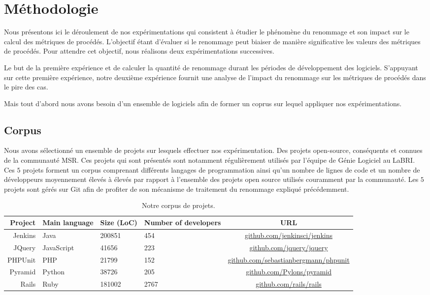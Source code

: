 \section{Méthodologie}
\label{sec:methodologie}

Nous présentons ici le déroulement de nos expérimentations qui consistent à étudier le phénomène du renommage et son impact sur le calcul des métriques de procédés. L’objectif étant d’évaluer si le renommage peut biaiser de manière significative les valeurs des métriques de procédés. Pour attendre cet objectif, nous réalisons deux expérimentations successives.

Le but de la première expérience et de calculer la quantité de renommage durant les périodes de développement des logiciels. S’appuyant sur cette première expérience, notre deuxième expérience fournit une analyse de l’impact du renommage sur les métriques de procédés dans le pire des cas. 

Mais tout d'abord nous avons besoin d'un ensemble de logiciels afin de former un coprus sur lequel appliquer nos expérimentations. 

\subsection{Corpus}

Nous avons sélectionné un ensemble de projets sur lesquels effectuer nos expérimentation. Des projets open-source, conséquents et connues de la communauté MSR. Ces projets qui sont présentés  sont notamment régulièrement utilisés par l'équipe de Génie Logiciel au LaBRI. Ces $5$ projets forment un corpus comprenant différents langages de programmation ainsi qu'un nombre de lignes de code et un nombre de développeurs moyennement élevés à élevés par rapport à l'ensemble des projets open source utilisés couramment par la communauté. Les $5$ projets sont gérés sur Git afin de profiter de son mécanisme de traitement du renommage expliqué précédemment. \\

\begin{table*}[h]
\centering
\small
\begin{tabular}{rllp{1.7cm}c}
\toprule
Project & Main language & Size (LoC) & Number of developers & URL\\
\midrule
Jenkins & Java & 200851 & 454 & \url{github.com/jenkinsci/jenkins} \\
JQuery & JavaScript & 41656 & 223 & \url{github.com/jquery/jquery} \\
PHPUnit & PHP & 21799 & 152 & \url{github.com/sebastianbergmann/phpunit}\\
Pyramid & Python & 38726 & 205 & \url{github.com/Pylons/pyramid} \\
Rails & Ruby & 181002 & 2767 & \url{github.com/rails/rails}\\
\bottomrule
\end{tabular}
\caption{Notre corpus de projets.}
\label{tab:projects}
\end{table*}

